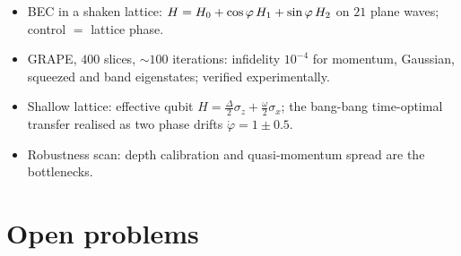\documentclass[handoutsbeamer.tex]{subfiles}
\begin{document}
\begin{frame}
{\begin{itemize}
    \item BEC in a shaken lattice: $H=H_{0}+\cos\varphi\,H_1+\sin\varphi\,H_2$ on $21$ plane waves; control $=$ lattice phase.
    \item GRAPE, $400$ slices, $\sim100$ iterations: infidelity $10^{-4}$ for momentum, Gaussian, squeezed and band eigenstates; verified experimentally.
    \item Shallow lattice: effective qubit $H=\tfrac{\Delta}{2}\sigma_z+\tfrac\omega2\sigma_x$; the \alert{bang-bang} time-optimal transfer realised as two phase drifts $\dot\varphi=1\pm0.5$.
    \item Robustness scan: depth calibration and quasi-momentum spread are the bottlenecks.
\end{itemize}}
\end{frame}

\section{Open problems}
\end{document}

